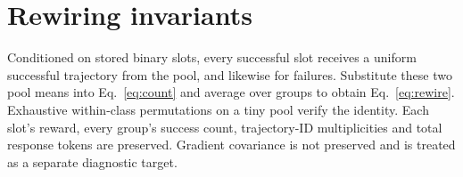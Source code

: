 \section{Rewiring invariants}
Conditioned on stored binary slots, every successful slot receives a uniform
successful trajectory from the pool, and likewise for failures. Substitute these
two pool means into Eq.~\ref{eq:count} and average over groups to obtain
Eq.~\ref{eq:rewire}. Exhaustive within-class permutations on a tiny pool verify
the identity. Each slot's reward, every group's success count, trajectory-ID
multiplicities and total response tokens are preserved. Gradient covariance is
not preserved and is treated as a separate diagnostic target.
